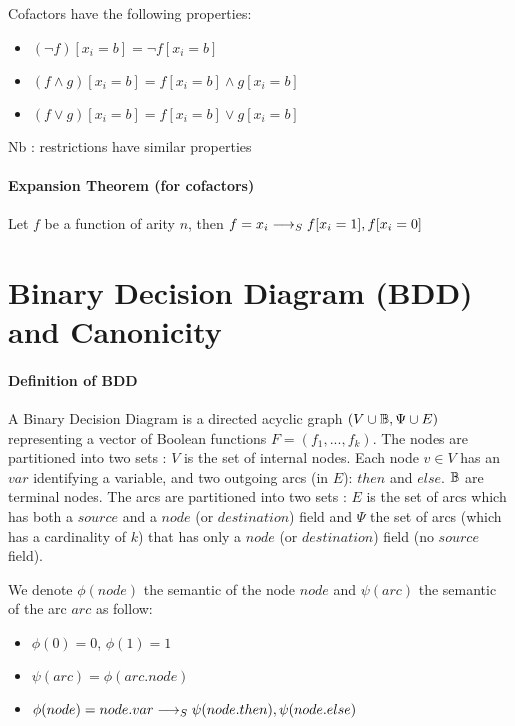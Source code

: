 \documentclass[a4paper,10pt]{article}
\begin{document}
Cofactors have the following properties:\begin{itemize}
\item $(\lnot f)[x_i = b] = \lnot f[x_i = b]$
\item $(f\land g)[x_i = b] = f[x_i = b] \land g[x_i = b]$
\item $(f\lor g)[x_i = b] = f[x_i = b] \lor g[x_i = b]$
\end{itemize}
Nb : restrictions have similar properties

\paragraph{Expansion Theorem (for cofactors)\\}
Let $f$ be a function of arity $n$, then $f = x_i \longrightarrow_S f[x_i=1], f[x_i=0]$

\section{Binary Decision Diagram (BDD) and Canonicity}

\paragraph{Definition of BDD\\}

A Binary Decision Diagram is a directed acyclic graph $(V\cup \mathbb{B}, \Psi \cup E)$ representing a vector of Boolean functions $F=(f_1, ..., f_k)$.
The nodes are partitioned into two sets : $V$ is the set of internal nodes.
Each node $v\in V$ has an $var$ identifying a variable, and two outgoing arcs (in $E$): $then$ and $else$. $\mathbb{B}$ are terminal nodes.
The arcs are partitioned into two sets : $E$ is the set of arcs which has both a $source$ and a $node$ (or $destination$) field and $\Psi$ the set of arcs (which has a cardinality of $k$) that has only a $node$ (or $destination$) field (no $source$ field).


We denote $\phi(node)$ the semantic of the node $node$ and $\psi(arc)$ the semantic of the arc $arc$ as follow:\begin{itemize}
\item $\phi(0) = 0$, $\phi(1) = 1$
\item $\psi(arc) = \phi(arc.node)$
\item $\phi(node) = node.var \longrightarrow_S \psi(node.then), \psi(node.else)$
\end{itemize}
\end{document}
